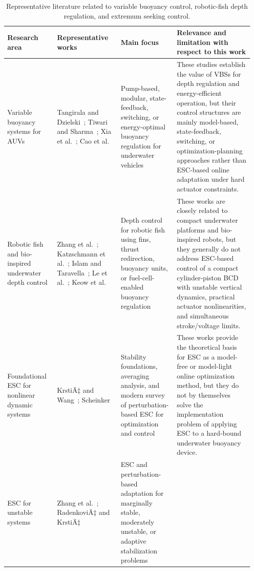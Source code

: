﻿\documentclass[subscriptcorrection,upint,varvw,barcolor=Goldenrod3,mathalfa=cal=euler,balance,hyphenate,french,pdf-a]{asmejour}
\begin{document}
\begin{table}[t]
\centering
\caption{Representative literature related to variable buoyancy control, robotic-fish depth regulation, and extremum seeking control.}
\label{tab:literature_gap}
\begin{tabular}{p{} p{} p{} p{}}
\hline
\textbf{Research area} & \textbf{Representative works} & \textbf{Main focus} & \textbf{Relevance and limitation with respect to this work} \\
\hline
Variable buoyancy systems for AUVs &
Tangirala and Dzielski~\cite{tangirala2007vbs}; Tiwari and Sharma~\cite{tiwari2020vbs}; Xia et al.~\cite{xia2024vbs}; Cao et al.~\cite{cao2023energy} &
Pump-based, modular, state-feedback, switching, or energy-optimal buoyancy regulation for underwater vehicles &
These studies establish the value of VBSs for depth regulation and energy-efficient operation, but their control structures are mainly model-based, state-feedback, switching, or optimization-planning approaches rather than ESC-based online adaptation under hard actuator constraints. \\
\hline
Robotic fish and bio-inspired underwater depth control &
Zhang et al.~\cite{zhang2007fish}; Katzschmann et al.~\cite{katzschmann2018sofi}; Islam and Taravella~\cite{islam2021anguilliform}; Le et al.~\cite{le2011bladder}; Keow et al.~\cite{keow2022fuelcell} &
Depth control for robotic fish using fins, thrust redirection, buoyancy units, or fuel-cell-enabled buoyancy regulation &
These works are closely related to compact underwater platforms and bio-inspired robots, but they generally do not address ESC-based control of a compact cylinder-piston BCD with unstable vertical dynamics, practical actuator nonlinearities, and simultaneous stroke/voltage limits. \\
\hline
Foundational ESC for nonlinear dynamic systems &
KrstiÄ‡ and Wang~\cite{krstic2000stability}; Scheinker~\cite{scheinker2024survey} &
Stability foundations, averaging analysis, and modern survey of perturbation-based ESC for optimization and control &
These works provide the theoretical basis for ESC as a model-free or model-light online optimization method, but they do not by themselves solve the implementation problem of applying ESC to a hard-bound underwater buoyancy device. \\
\hline
ESC for unstable systems &
Zhang et al.~\cite{zhang2007unstable}; RadenkoviÄ‡ and KrstiÄ‡~\cite{radenkovic2018adaptive} &
ESC and perturbation-based adaptation for marginally stable, moderately unstable, or adaptive stabilization problems &

\end{tabular}
\end{table}
\end{document}
